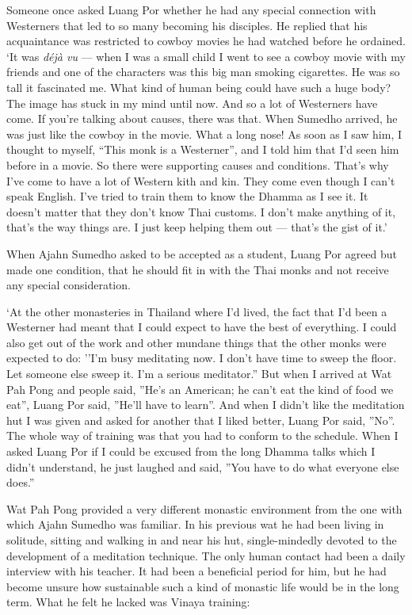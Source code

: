 Someone once asked Luang Por whether he had any special connection with
Westerners that led to so many becoming his disciples. He replied that
his acquaintance was restricted to cowboy movies he had watched before
he ordained. `It was \emph{déjà vu} --- when I was a small child I went
to see a cowboy movie with my friends and one of the characters was this
big man smoking cigarettes. He was so tall it fascinated me. What kind
of human being could have such a huge body? The image has stuck in my
mind until now. And so a lot of Westerners have come. If you're talking
about causes, there was that. When Sumedho arrived, he was just like the
cowboy in the movie. What a long nose! As soon as I saw him, I thought
to myself, ``This monk is a Westerner'', and I told him that I'd seen
him before in a movie. So there were supporting causes and conditions.
That's why I've come to have a lot of Western kith and kin. They come
even though I can't speak English. I've tried to train them to know the
Dhamma as I see it. It doesn't matter that they don't know Thai customs.
I don't make anything of it, that's the way things are. I just keep
helping them out --- that's the gist of it.'

When Ajahn Sumedho asked to be accepted as a student, Luang Por agreed
but made one condition, that he should fit in with the Thai monks and
not receive any special consideration.

`At the other monasteries in Thailand where I'd lived, the fact that I'd
been a Westerner had meant that I could expect to have the best of
everything. I could also get out of the work and other mundane things
that the other monks were expected to do: ''I'm busy meditating now. I
don't have time to sweep the floor. Let someone else sweep it. I'm a
serious meditator.'' But when I arrived at Wat Pah Pong and people said,
''He's an American; he can't eat the kind of food we eat'', Luang Por
said, ''He'll have to learn''. And when I didn't like the meditation hut
I was given and asked for another that I liked better, Luang Por said,
''No''. The whole way of training was that you had to conform to the
schedule. When I asked Luang Por if I could be excused from the long
Dhamma talks which I didn't understand, he just laughed and said, ''You
have to do what everyone else does.''

Wat Pah Pong provided a very different monastic environment from the one
with which Ajahn Sumedho was familiar. In his previous wat he had been
living in solitude, sitting and walking in and near his hut,
single-mindedly devoted to the development of a meditation technique.
The only human contact had been a daily interview with his teacher. It
had been a beneficial period for him, but he had become unsure how
sustainable such a kind of monastic life would be in the long term. What
he felt he lacked was Vinaya training:

